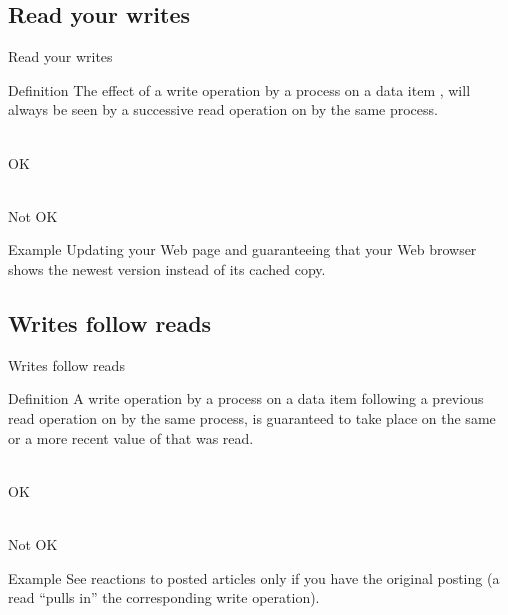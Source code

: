 \subsection{Read your writes}
\begin{slide}{Read your writes}
  \begin{block}{Definition}
    The effect of a write operation by a process on a data item , will always be seen by a successive read
    operation on  by the same process. 
  \end{block}
  \begin{centerfig}
     \\
    OK
  \end{centerfig}
  \vspace*{12pt}
  \begin{centerfig}
     \\
    Not OK
  \end{centerfig}
  \begin{exampleblock}{Example}
    Updating your Web page and guaranteeing that your Web browser shows the newest version instead of its
    cached copy.
  \end{exampleblock}
\end{slide}
\subsection{Writes follow reads}
\begin{slide}{Writes follow reads}
  \begin{block}{Definition}
    A write operation by a process on a data item  following a previous read operation on  by the same
    process, is guaranteed to take place on the same or a more recent value of  that was read.
  \end{block}
  \begin{centerfig}
     \\
    OK
  \end{centerfig}
  \vspace*{12pt}
  \begin{centerfig}
     \\
    Not OK
  \end{centerfig}
  \begin{exampleblock}{Example}
    See reactions to posted articles only if you have the original posting (a read ``pulls in'' the
    corresponding write operation).
  \end{exampleblock}
\end{slide}
